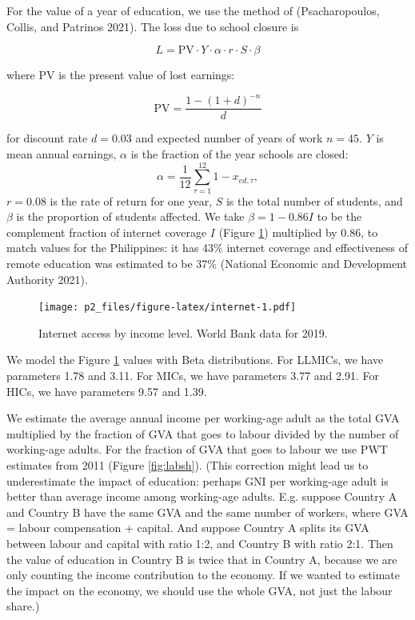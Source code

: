 \documentclass[
]{article}
\begin{document}
For the value of a year of education, we use the method of (Psacharopoulos, Collis, and Patrinos 2021). The loss due to school closure is

\[L = \text{PV}\cdot Y\cdot \alpha\cdot r\cdot S\cdot \beta\]

where PV is the present value of lost earnings:

\[\text{PV} =  \frac{1-(1+d)^{-n}}{d}\]

for discount rate \(d=0.03\) and expected number of years of work \(n=45\). \(Y\) is mean annual earnings, \(\alpha\) is the fraction of the year schools are closed: \[\alpha=\frac{1}{12}\sum_{\tau=1}^{12}1-x_{ed,\tau},\] \(r=0.08\) is the rate of return for one year, \(S\) is the total number of students, and \(\beta\) is the proportion of students affected. We take \(\beta=1-0.86I\) to be the complement fraction of internet coverage \(I\) (Figure \ref{fig:internet}) multiplied by 0.86, to match values for the Philippines: it has 43\% internet coverage and effectiveness of remote education was estimated to be 37\% (National Economic and Development Authority 2021).

\begin{figure}
\centering
\texttt{[image: p2\_files/figure-latex/internet-1.pdf]}
\caption{\label{fig:internet}Internet access by income level. World Bank data for 2019.}
\end{figure}

We model the Figure \ref{fig:internet} values with Beta distributions. For LLMICs, we have parameters 1.78 and 3.11. For MICs, we have parameters 3.77 and 2.91. For HICs, we have parameters 9.57 and 1.39.

We estimate the average annual income per working-age adult as the total GVA multiplied by the fraction of GVA that goes to labour divided by the number of working-age adults. For the fraction of GVA that goes to labour we use PWT estimates from 2011 (Figure \ref{fig:labsh}). (This correction might lead us to underestimate the impact of education: perhaps GNI per working-age adult is better than average income among working-age adults. E.g. suppose Country A and Country B have the same GVA and the same number of workers, where GVA = labour compensation + capital. And suppose Country A splits its GVA between labour and capital with ratio 1:2, and Country B with ratio 2:1. Then the value of education in Country B is twice that in Country A, because we are only counting the income contribution to the economy. If we wanted to estimate the impact on the economy, we should use the whole GVA, not just the labour share.)
\end{document}

